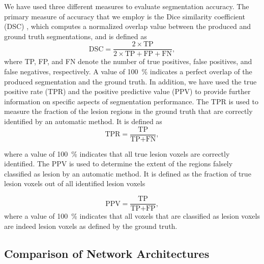 We have used three different measures to evaluate segmentation accuracy. The
primary measure of accuracy that we employ is the Dice similarity coefficient
(DSC) \cite{dice1945measures}, which computes a normalized overlap value between
the produced and ground truth segmentations, and is defined as
\begin{equation}
\text{DSC} = \frac{2 \times \text{TP}}{2 \times \text{TP} + \text{FP} +
\text{FN}},
\end{equation}
where TP, FP, and FN denote the number of true positives, false positives, and
false negatives, respectively. A value of \SI{100}{\percent} indicates a perfect
overlap of the produced segmentation and the ground truth.
In addition, we have used the true positive rate (TPR) and the positive
predictive value (PPV) to provide further information on specific aspects of
segmentation performance. The TPR is used to measure the fraction of the lesion
regions in the ground truth that are correctly identified by
an automatic method. It is defined as
\begin{equation}
\text{TPR} = \frac{\text{TP}}{\text{TP} + \text{FN}},
\end{equation}

where a value of \SI{100}{\percent} indicates that all true lesion voxels are
correctly identified. The PPV is used to determine the extent of the regions
falsely classified as lesion by an automatic method. It is defined as the
fraction of true lesion voxels out of all identified lesion voxels

\begin{equation}
\text{PPV} = \frac{\text{TP}}{\text{TP} + \text{FP}},
\end{equation}
where a value of \SI{100}{\percent} indicates that all voxels that are
classified as lesion voxels are indeed lesion voxels as defined by the ground
truth.

\subsection{Comparison of Network Architectures}

